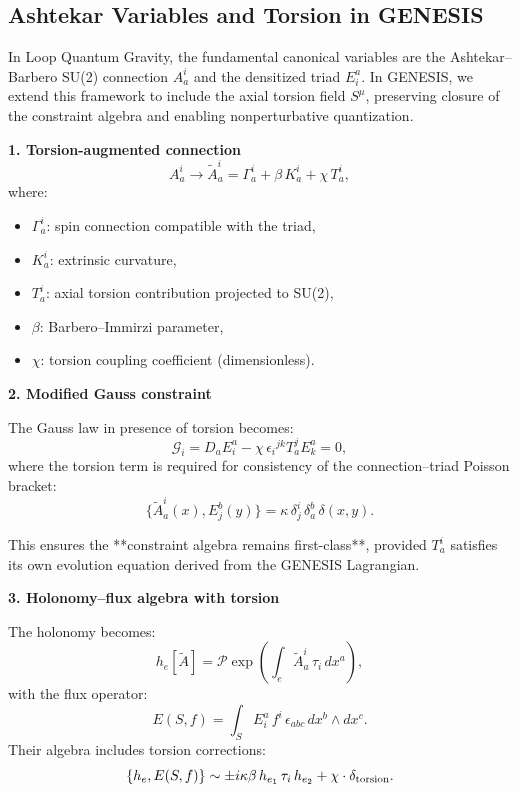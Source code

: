 \documentclass{article}
\begin{document}
\subsection{Ashtekar Variables and Torsion in GENESIS}

In Loop Quantum Gravity, the fundamental canonical variables are the Ashtekar–Barbero SU(2) connection \( A^i_a \) and the densitized triad \( E^a_i \). In GENESIS, we extend this framework to include the axial torsion field \( S^\mu \), preserving closure of the constraint algebra and enabling nonperturbative quantization.

\vspace{1em}
\noindent\textbf{1. Torsion-augmented connection}
\[
  A^i_a \longrightarrow \tilde A^i_a = \Gamma^i_a + \beta\,K^i_a + \chi\,T^i_a,
\]
where:
\begin{itemize}[leftmargin=2em]
  \item \( \Gamma^i_a \): spin connection compatible with the triad,
  \item \( K^i_a \): extrinsic curvature,
  \item \( T^i_a \): axial torsion contribution projected to SU(2),
  \item \( \beta \): Barbero–Immirzi parameter,
  \item \( \chi \): torsion coupling coefficient (dimensionless).
\end{itemize}

\vspace{1em}
\noindent\textbf{2. Modified Gauss constraint}

The Gauss law in presence of torsion becomes:
\[
  \mathcal{G}_i = D_a E^a_i - \chi\,\epsilon_{i}{}^{jk} T^j_a E^a_k = 0,
\]
where the torsion term is required for consistency of the connection–triad Poisson bracket:
\[
  \{ \tilde A^i_a(x), E^b_j(y) \} = \kappa\,\delta^i_j\,\delta^b_a\,\delta(x,y).
\]

This ensures the **constraint algebra remains first-class**, provided \( T^i_a \) satisfies its own evolution equation derived from the GENESIS Lagrangian.

\vspace{1em}
\noindent\textbf{3. Holonomy–flux algebra with torsion}

The holonomy becomes:
\[
  h_e[\tilde A] = \mathcal{P} \exp \left( \int_e \tilde A^i_a\,\tau_i\,dx^a \right),
\]
with the flux operator:
\[
  E(S,f) = \int_S E^a_i\,f^i\,\epsilon_{abc}\,dx^b \wedge dx^c.
\]
Their algebra includes torsion corrections:
\[
  \{ h_e, E(S,f) \} \sim \pm i\kappa\beta\,h_{e_1}\,\tau_i\,h_{e_2} + \chi \cdot \delta_{\rm torsion}.
\]
\end{document}
